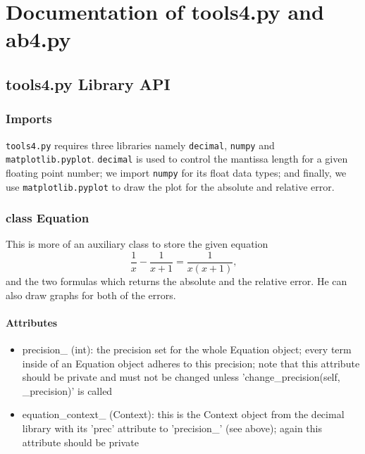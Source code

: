 \section{Documentation of tools4.py and ab4.py}
\subsection{tools4.py Library API}
\subsubsection{Imports}
\texttt{tools4.py} requires three libraries namely \texttt{decimal}, \texttt{numpy} and \texttt{matplotlib.pyplot}. \texttt{decimal} is used to control the mantissa length for a given floating point number; we import \texttt{numpy} for its float data types; and finally, we use \texttt{matplotlib.pyplot} to draw the plot for the absolute and relative error.
\subsubsection{class Equation}
This is more of an auxiliary class to store the given equation
\begin{equation*}
    \frac{1}{x} - \frac{1}{x + 1} = \frac{1}{x (x + 1)} \text{,}
\end{equation*}
and the two formulas which returns the absolute and the relative error. He can also draw graphs for both of
the errors.
\paragraph{Attributes}
\begin{itemize}
    \item precision\_ (int): the precision set for the whole Equation object; every term inside of an Equation
    object adheres to this precision; note that this attribute should be private and must not be changed
    unless 'change\_precision(self, \_precision)' is called
    \item equation\_context\_ (Context): this is the Context object from the decimal library with its 'prec'
    attribute to 'precision\_' (see above); again this attribute should be private
\end{itemize}
